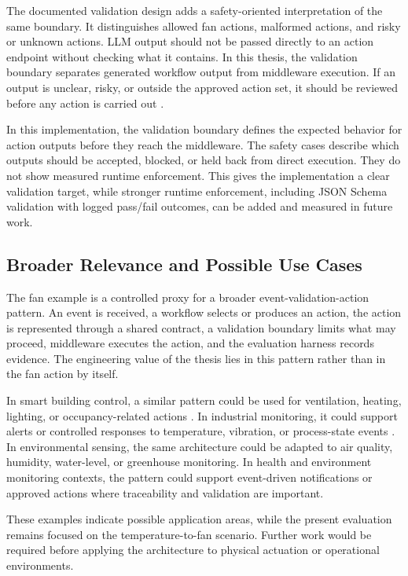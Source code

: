 The documented validation design adds a safety-oriented interpretation of the same boundary. It distinguishes allowed fan actions, malformed actions, and risky or unknown actions.
LLM output should not be passed directly to an action endpoint without checking what it contains. In this thesis, the validation boundary separates generated workflow output from middleware execution. If an output is unclear, risky, or outside the approved action set, it should be reviewed before any action is carried out \cite{humanInTheLoopAmershi2014}.


In this implementation, the validation boundary defines the expected behavior for action outputs before they reach the middleware. The safety cases describe which outputs should be accepted, blocked, or held back from direct execution. They do not show measured runtime enforcement. This gives the implementation a clear validation target, while stronger runtime enforcement, including JSON Schema validation with logged pass/fail outcomes, can be added and measured in future work.

\subsection{Broader Relevance and Possible Use Cases}\label{subsec:discussion-broader-relevance}

The fan example is a controlled proxy for a broader event-validation-action pattern. An event is received, a workflow selects or produces an action, the action is represented through a shared contract, a validation boundary limits what may proceed, middleware executes the action, and the evaluation harness records evidence. The engineering value of the thesis lies in this pattern rather than in the fan action by itself.

In smart building control, a similar pattern could be used for ventilation, heating, lighting, or occupancy-related actions \cite{smartBuildingsMinoli2017}. In industrial monitoring, it could support alerts or controlled responses to temperature, vibration, or process-state events \cite{industrialIotXu2018}. In environmental sensing, the same architecture could be adapted to air quality, humidity, water-level, or greenhouse monitoring. In health and environment monitoring contexts, the pattern could support event-driven notifications or approved actions where traceability and validation are important.

These examples indicate possible application areas, while the present evaluation remains focused on the temperature-to-fan scenario. Further work would be required before applying the architecture to physical actuation or operational environments.

